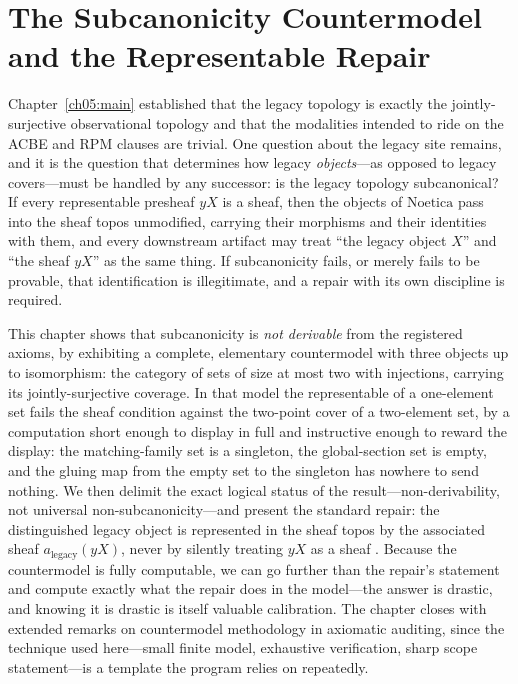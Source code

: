 \chapter{The Subcanonicity Countermodel and the Representable Repair}\label{ch06:main}

Chapter~\ref{ch05:main} established that the legacy topology is exactly the
jointly-surjective observational topology and that the modalities intended
to ride on the ACBE and RPM clauses are trivial. One question about the
legacy site remains, and it is the question that determines how legacy
\emph{objects}---as opposed to legacy covers---must be handled by any
successor: is the legacy topology subcanonical? If every representable
presheaf $yX$ is a sheaf, then the objects of $\mathrm{Noetica}$ pass into
the sheaf topos unmodified, carrying their morphisms and their identities
with them, and every downstream artifact may treat ``the legacy object $X$''
and ``the sheaf $yX$'' as the same thing. If subcanonicity fails, or merely
fails to be provable, that identification is illegitimate, and a repair with
its own discipline is required.

This chapter shows that subcanonicity is \emph{not derivable} from the
registered axioms, by exhibiting a complete, elementary countermodel with
three objects up to isomorphism: the category of sets of size at most two
with injections, carrying its jointly-surjective coverage. In that model the
representable of
a one-element set fails the sheaf condition against the two-point cover of a
two-element set, by a computation short enough to display in full and
instructive enough to reward the display: the matching-family set is a
singleton, the global-section set is empty, and the gluing map from the
empty set to the singleton has nowhere to send nothing. We then delimit the
exact logical status of the result---non-derivability, not universal
non-subcanonicity---and present the standard repair: the distinguished
legacy object is represented in the sheaf topos by the associated sheaf
$a_{\mathrm{legacy}}(yX)$, never by silently treating $yX$ as a sheaf
\cite{stacks00WO}. Because the countermodel is fully computable, we can go
further than the repair's statement and compute exactly what the repair does
in the model---the answer is drastic, and knowing it is drastic is itself
valuable calibration. The chapter closes with extended remarks on
countermodel methodology in axiomatic auditing, since the technique used
here---small finite model, exhaustive verification, sharp scope
statement---is a template the program relies on repeatedly.

